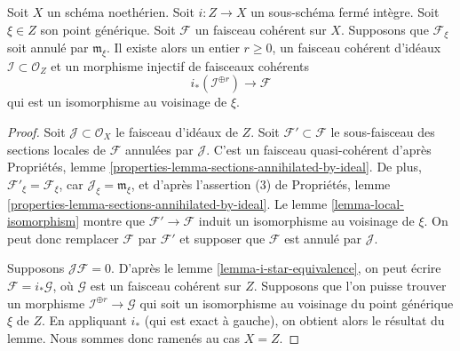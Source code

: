 \begin{lemma}
\label{lemma-prepare-filter-irreducible}
Soit $X$ un schéma noethérien.
Soit $i : Z \to X$ un sous-schéma fermé intègre.
Soit $\xi \in Z$ son point générique.
Soit $\mathcal{F}$ un faisceau cohérent sur $X$.
Supposons que $\mathcal{F}_\xi$ soit annulé par
$\mathfrak m_\xi$. Il existe alors un entier
$r \geq 0$, un faisceau cohérent d'idéaux $\mathcal{I} \subset \mathcal{O}_Z$
et un morphisme injectif de faisceaux cohérents
$$
i_*\left(\mathcal{I}^{\oplus r}\right) \to \mathcal{F}
$$
qui est un isomorphisme au voisinage de $\xi$.
\end{lemma}

\begin{proof}
Soit $\mathcal{J} \subset \mathcal{O}_X$ le faisceau d'idéaux de $Z$.
Soit $\mathcal{F}' \subset \mathcal{F}$ le sous-faisceau des
sections locales de $\mathcal{F}$ annulées par
$\mathcal{J}$. C'est un faisceau quasi-cohérent d'après
Propriétés, lemme \ref{properties-lemma-sections-annihilated-by-ideal}. De
plus, $\mathcal{F}'_\xi = \mathcal{F}_\xi$, car
$\mathcal{J}_\xi = \mathfrak m_\xi$, et d'après l'assertion (3)
de Propriétés, lemme \ref{properties-lemma-sections-annihilated-by-ideal}.
Le lemme \ref{lemma-local-isomorphism} montre que
$\mathcal{F}' \to \mathcal{F}$
induit un isomorphisme au voisinage de $\xi$.
On peut donc remplacer $\mathcal{F}$ par $\mathcal{F}'$ et supposer
que $\mathcal{F}$ est annulé par $\mathcal{J}$.

\medskip\noindent
Supposons $\mathcal{J}\mathcal{F} = 0$. D'après le
lemme \ref{lemma-i-star-equivalence}, on peut écrire
$\mathcal{F} = i_*\mathcal{G}$,
où $\mathcal{G}$ est un faisceau cohérent sur $Z$. Supposons que l'on puisse trouver un morphisme
$\mathcal{I}^{\oplus r} \to \mathcal{G}$ qui soit un
isomorphisme au voisinage du point générique $\xi$ de $Z$.
En appliquant $i_*$ (qui est exact à gauche), on obtient alors le résultat du
lemme. Nous sommes donc ramenés au cas $X = Z$.


\end{proof}
